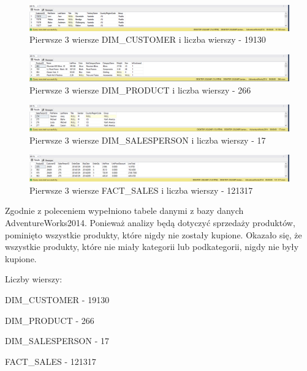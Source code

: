 \documentclass[a4paper,12pt]{article}
\begin{document}
\begin{figure}[H]
  \centering
  \includegraphics[width=1.0\textwidth]{images/3_customers.png}
  \caption{Pierwsze 3 wiersze DIM\_CUSTOMER i liczba wierszy - 19130}
\end{figure}

\begin{figure}[H]
  \centering
  \includegraphics[width=1.0\textwidth]{images/3_products.png}
  \caption{Pierwsze 3 wiersze DIM\_PRODUCT i liczba wierszy - 266}
\end{figure}

\begin{figure}[H]
  \centering
  \includegraphics[width=1.0\textwidth]{images/3_sale_people.png}
  \caption{Pierwsze 3 wiersze DIM\_SALESPERSON i liczba wierszy - 17}
\end{figure}

\begin{figure}[H]
  \centering
  \includegraphics[width=1.0\textwidth]{images/3_sales.png}
  \caption{Pierwsze 3 wiersze FACT\_SALES i liczba wierszy - 121317}
\end{figure}

Zgodnie z poleceniem wypełniono tabele danymi z bazy danych AdventureWorks2014. Ponieważ analizy będą dotyczyć sprzedaży produktów, pominięto wszystkie produkty, które nigdy nie zostały kupione. Okazało się, że wszystkie produkty, które nie miały kategorii lub podkategorii, nigdy nie były kupione.

Liczby wierszy:

DIM\_CUSTOMER - 19130

DIM\_PRODUCT - 266

DIM\_SALESPERSON - 17

FACT\_SALES - 121317

\printbibliography
\end{document}
